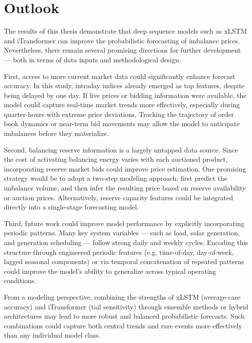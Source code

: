 \documentclass[class=scrbook, crop=false]{standalone}
\begin{document}
\section{Outlook}
\label{Section::Outlook}
The results of this thesis demonstrate that deep sequence models such as xLSTM and iTransformer can improve the probabilistic forecasting of imbalance prices. Nevertheless, there remain several promising directions for further development — both in terms of data inputs and methodological design.

First, access to more current market data could significantly enhance forecast accuracy. In this study, intraday indices already emerged as top features, despite being delayed by one day. If live prices or bidding information were available, the model could capture real-time market trends more effectively, especially during quarter-hours with extreme price deviations. Tracking the trajectory of order book dynamics or near-term bid movements may allow the model to anticipate imbalances before they materialize.

Second, balancing reserve information is a largely untapped data source. Since the cost of activating balancing energy varies with each auctioned product, incorporating reserve market bids could improve price estimation. One promising strategy would be to adopt a two-step modeling approach: first predict the imbalance volume, and then infer the resulting price based on reserve availability or auction prices. Alternatively, reserve capacity features could be integrated directly into a single-stage forecasting model.

Third, future work could improve model performance by explicitly incorporating periodic patterns. Many key system variables — such as load, solar generation, and generation scheduling — follow strong daily and weekly cycles. Encoding this structure through engineered periodic features (e.g. time-of-day, day-of-week, lagged seasonal components) or via temporal concatenation of repeated patterns could improve the model’s ability to generalize across typical operating conditions.

From a modeling perspective, combining the strengths of xLSTM (average-case accuracy) and iTransformer (tail sensitivity) through ensemble methods or hybrid architectures may lead to more robust and balanced probabilistic forecasts. Such combinations could capture both central trends and rare events more effectively than any individual model class.
\end{document}
